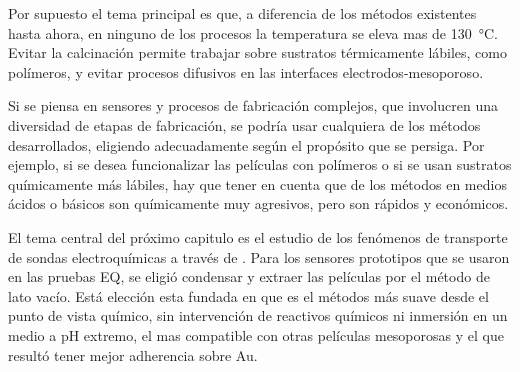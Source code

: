 	
	Por supuesto el tema principal es que, a diferencia de los métodos existentes hasta ahora, en ninguno de los procesos la temperatura se eleva mas de \SI{130}{\celsius}. Evitar la calcinación permite trabajar sobre sustratos térmicamente lábiles, como polímeros, y evitar procesos difusivos en las interfaces electrodos-mesoporoso. 

	Si se piensa en sensores y procesos de fabricación complejos, que involucren una diversidad de etapas de fabricación, se podría usar cualquiera de los métodos desarrollados, eligiendo adecuadamente según el propósito que se persiga. Por ejemplo, si se desea funcionalizar las películas con polímeros o si se usan sustratos químicamente más lábiles, hay que tener en cuenta que de los métodos en medios ácidos o básicos son químicamente muy agresivos, pero son rápidos y económicos. 


	El tema central del próximo capitulo es el estudio de los fenómenos de transporte de sondas electroquímicas a través de \pdm. Para los sensores prototipos que se usaron en las pruebas EQ, se eligió condensar y extraer las películas por el método de lato vacío. Está elección esta fundada en que es el métodos más suave desde el punto de vista químico, sin intervención de reactivos químicos ni inmersión en un medio a pH extremo, el mas compatible con otras películas mesoporosas y el que resultó tener mejor adherencia sobre Au. 			 

	


